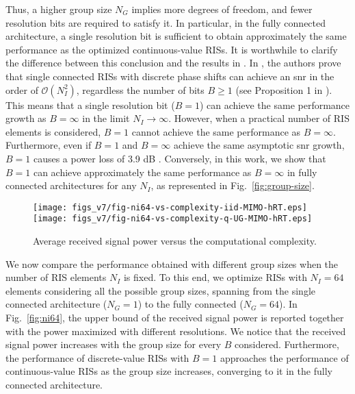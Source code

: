 \documentclass[twocolumn,10pt]{IEEEtran}
\begin{document}
Thus, a higher group size $N_{G}$ implies more degrees of freedom, and fewer resolution bits are required to satisfy it.
In particular, in the fully connected architecture, a single resolution bit is sufficient to obtain approximately the same performance as the optimized continuous-value RISs.
%
It is worthwhile to clarify the difference between this conclusion and the results in \cite{jun21}.
In \cite{jun21}, the authors prove that single connected RISs with discrete phase shifts can achieve an \gls{snr} in the order of $\mathcal{O}\left(N_{I}^2\right)$, regardless the number of bits $B\geq 1$ (see Proposition 1 in \cite{jun21}).
This means that a single resolution bit ($B = 1$) can achieve the same performance growth as $B=\infty$ in the limit $N_{I}\rightarrow\infty$.
However, when a practical number of RIS elements is considered, $B = 1$ cannot achieve the same performance as $B=\infty$.
Furthermore, even if $B = 1$ and $B=\infty$ achieve the same asymptotic \gls{snr} growth, $B = 1$ causes a power loss of 3.9 dB \cite{wu19b}.
Conversely, in this work, we show that $B = 1$ can achieve approximately the same performance as $B=\infty$ in fully connected architectures for any $N_{I}$, as represented in Fig.~\ref{fig:group-size}.

\begin{figure*}[t]
    \centering
    \texttt{[image: figs\_v7/fig-ni64-vs-complexity-iid-MIMO-hRT.eps]}
    \texttt{[image: figs\_v7/fig-ni64-vs-complexity-q-UG-MIMO-hRT.eps]}
    \caption{Average received signal power versus the computational complexity.}
    \label{fig:ni64-vs-compl}
\end{figure*}

We now compare the performance obtained with different group sizes when the number of RIS elements $N_{I}$ is fixed.
To this end, we optimize RISs with $N_{I}=64$ elements considering all the possible group sizes, spanning from the single connected architecture ($N_{G}=1$) to the fully connected ($N_{G}=64$).
In Fig.~\ref{fig:ni64}, the upper bound of the received signal power is reported together with the power maximized with different resolutions.
We notice that the received signal power increases with the group size for every $B$ considered.
Furthermore, the performance of discrete-value RISs with $B=1$ approaches the performance of continuous-value RISs as the group size increases, converging to it in the fully connected architecture.
\end{document}
